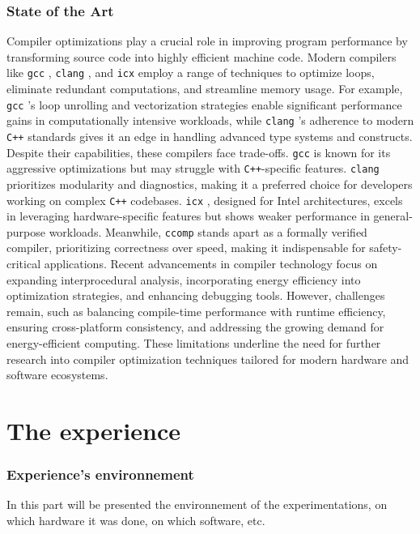\documentclass{rapport}
\newcommand{\gcc}{\texttt{gcc} }
\newcommand{\icx}{\texttt{icx} }
\newcommand{\clang}{\texttt{clang} }
\newcommand{\comp}{\texttt{ccomp} }
\begin{document}
\section{State of the Art}
Compiler optimizations play a crucial role in improving program performance by transforming source code into highly efficient machine code. Modern compilers like \gcc, \clang, and \icx 
employ a range of techniques to optimize loops, eliminate redundant computations, and streamline memory usage. For example, \gcc’s loop unrolling and vectorization strategies enable 
significant performance gains in computationally intensive workloads, while \clang’s adherence to modern \texttt{C++} standards gives it an edge in handling advanced type systems and 
constructs.
\newline\newline
Despite their capabilities, these compilers face trade-offs. \gcc is known for its aggressive optimizations but may struggle with \texttt{C++}-specific features. \clang prioritizes 
modularity and diagnostics, making it a preferred choice for developers working on complex \texttt{C++} codebases. \icx, designed for Intel architectures, excels in leveraging 
hardware-specific features but shows weaker performance in general-purpose workloads. Meanwhile, \comp stands apart as a formally verified compiler, prioritizing correctness over speed, 
making it indispensable for safety-critical applications.
\newline\newline
Recent advancements in compiler technology focus on expanding interprocedural analysis, incorporating energy efficiency into optimization strategies, and enhancing debugging tools. 
However, challenges remain, such as balancing compile-time performance with runtime efficiency, ensuring cross-platform consistency, and addressing the growing demand for 
energy-efficient computing. These limitations underline the need for further research into compiler optimization techniques tailored for modern hardware and software ecosystems.
\clearpage

\part{The experience}

\section{Experience's environnement}
In this part will be presented the environnement of the experimentations, on which hardware it was done, on which software, etc.
\end{document}
